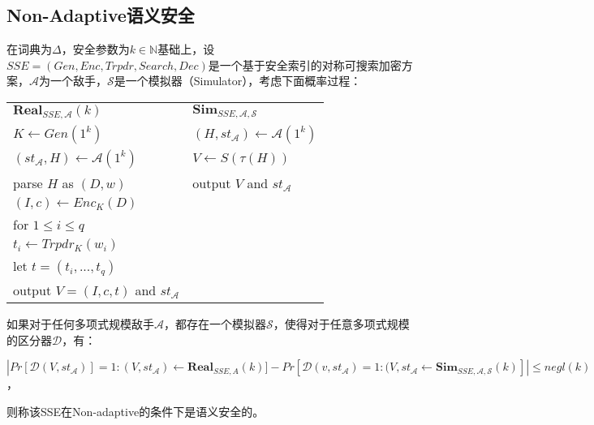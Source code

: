 \subsection{\textbf{Non-Adaptive语义安全}}
\label{sec:search_symm_security_model_nonadaptive_semantic_security}
\begin{defn}
\label{defn:non_adaptive_semantic_security}
在词典为$\Delta$，安全参数为$k \in \mathbb{N}$基础上，设$SSE = (Gen, Enc, Trpdr, Search, Dec) $是一个基于安全索引的对称可搜索加密方案，$\mathcal{A}$为一个敌手，$\mathcal{S}$是一个模拟器（Simulator），考虑下面概率过程：
\begin{center}
\begin{tabular}{ l l }
    $\textbf{Real}_{SSE,\mathcal{A}}(k)$  &  $\textbf{Sim}_{SSE,\mathcal{A},\mathcal{S}}$    \\
    \quad $K \leftarrow Gen(1^k)$   &   \quad $(H,st_\mathcal{A}) \leftarrow \mathcal{A}(1^k)$ \\
    \quad $(st_\mathcal{A},H) \leftarrow \mathcal{A}(1^k)$ & \quad $V \leftarrow S(\tau (H))$ \\
    \quad parse $H$ as $(D,w)$          &   \quad output $V$ and $st_\mathcal{A}$             \\
    \quad $(I,c) \leftarrow Enc_K(D)$            &   \\
    \quad for $1 \leq i \leq q $                 &   \\
    \quad \quad $t_i \leftarrow Trpdr_K(w_i)$    &   \\
    \quad let $t = (t_i, ..., t_q)$              &    \\
    \quad output $V = (I,c,t)$ and $st_\mathcal{A}$    &
\end{tabular}
\end{center}
如果对于任何多项式规模敌手$\mathcal{A}$，都存在一个模拟器$\mathcal{S}$，使得对于任意多项式规模的区分器$\mathcal{D}$，有：
\begin{center}
$|Pr[\mathcal{D}(V,st_\mathcal{A})] = 1 : (V,st_\mathcal{A}) \leftarrow \textbf{Real}_{SSE,A}(k)] - Pr[\mathcal{D}(v,st_\mathcal{A})=1 : (V,st_\mathcal{A} \leftarrow \textbf{Sim}_{SSE,\mathcal{A},\mathcal{S}}(k)] | \leq negl(k)$，
\end{center}
则称该SSE在Non-adaptive的条件下是语义安全的。
\end{defn}




